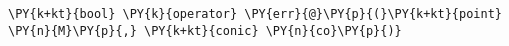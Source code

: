 \begin{Verbatim}[commandchars=\\\{\}]
    \PY{k+kt}{bool} \PY{k}{operator} \PY{err}{@}\PY{p}{(}\PY{k+kt}{point} \PY{n}{M}\PY{p}{,} \PY{k+kt}{conic} \PY{n}{co}\PY{p}{)}
\end{Verbatim}
